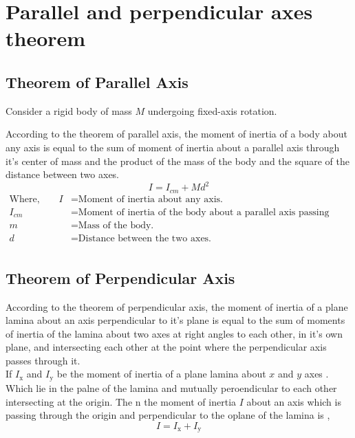 \section{Parallel and perpendicular axes theorem}
\subsection{ Theorem of Parallel Axis }
Consider a rigid body of mass $M$ undergoing fixed-axis rotation. 
\begin{theorem}
According to the theorem of parallel axis, the moment of inertia of a body about any axis is equal to the sum of moment of inertia about a parallel axis through it's center of mass and the product of the mass of the body and the square of the distance between two axes.
\begin{equation}
I= I_{cm}+M d^{2}
\end{equation}
\begin{align*}
\text{Where,}\qquad I&= \text{Moment of inertia about any axis.}\\
I_{cm}&= \text{Moment of inertia of the body about a parallel axis passing through it's center of mass.}\\
m&= \text{Mass of the body.}\\
d&= \text{Distance between the two axes.}\\
\end{align*}
\end{theorem}
\subsection{Theorem of Perpendicular Axis}
\begin{theorem}
According to the theorem of perpendicular axis, the moment of inertia of a plane lamina about an axis perpendicular to it's plane is equal to the sum of moments of inertia of the lamina about two axes  at right angles to each other, in it's own plane, and intersecting each other at the point where the perpendicular axis passes through it.\\
If  $I_{\mathrm{x}}$  and $I_{\mathrm{y}}$ be the moment of inertia of a plane lamina about $x$ and $y$ axes . Which lie in the palne of the lamina  and mutually peroendicular to each other intersecting at the origin. The n the moment of inertia  $I$ about an axis which is passing through the origin and perpendicular to the oplane of the lamina is ,
\begin{equation}
I=I_{\mathrm{x}}+I_{\mathrm{y}}
\end{equation}
\end{theorem}

